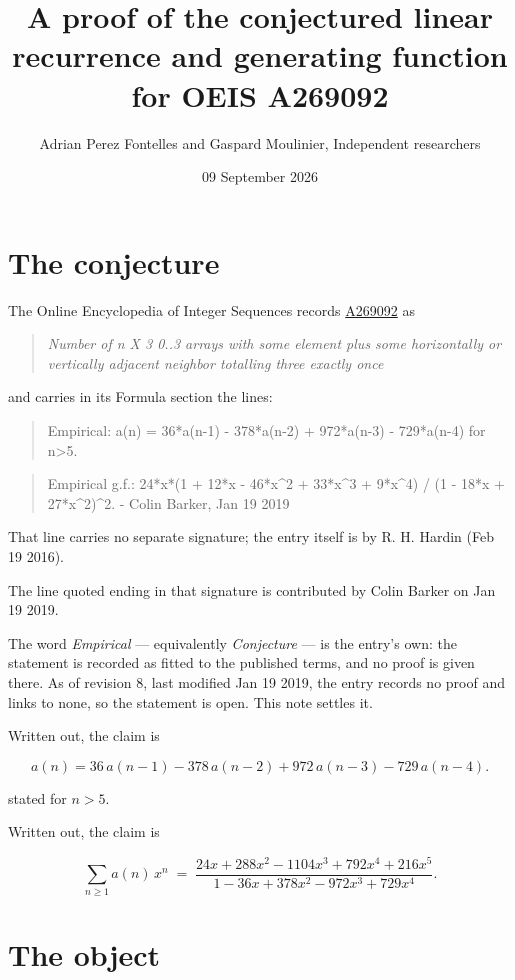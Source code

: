 \documentclass[11pt]{article}
\title{A proof of the conjectured linear recurrence and generating function for OEIS A269092}
\author{Adrian Perez Fontelles and Gaspard Moulinier, Independent researchers}
\date{09 September 2026}
\theoremstyle{definition}
\begin{document}
\maketitle
\section{The conjecture}

The Online Encyclopedia of Integer Sequences records \href{https://oeis.org/A269092}{A269092} as

\begin{quote}\itshape Number of n X 3 0..3 arrays with some element plus some horizontally or vertically adjacent neighbor totalling three exactly once\end{quote}

and carries in its Formula section the lines:

\begin{quote}\ttfamily Empirical: a(n) = 36*a(n-1) - 378*a(n-2) + 972*a(n-3) - 729*a(n-4) for n>5.\end{quote}

\begin{quote}\ttfamily Empirical g.f.: 24*x*(1 + 12*x - 46*x\textasciicircum{}2 + 33*x\textasciicircum{}3 + 9*x\textasciicircum{}4) / (1 - 18*x + 27*x\textasciicircum{}2)\textasciicircum{}2. - Colin Barker, Jan 19 2019\end{quote}

That line carries no separate signature; the entry itself is by R. H. Hardin (Feb 19 2016).

The line quoted ending in that signature is contributed by Colin Barker on Jan 19 2019.

The word {\itshape Empirical} --- equivalently {\itshape Conjecture} --- is the entry's own: the statement is recorded as fitted to the published terms, and no proof is given there. As of revision 8, last modified Jan 19 2019, the entry records no proof and links to none, so the statement is open. This note settles it.

Written out, the claim is

\[a(n) = 36\,a(n-1) - 378\,a(n-2) + 972\,a(n-3) - 729\,a(n-4).\]

stated for $n > 5$.

Written out, the claim is

\[\sum_{n \ge 1} a(n)\,x^n \;=\; \frac{24x + 288x^{2} - 1104x^{3} + 792x^{4} + 216x^{5}}{1 - 36x + 378x^{2} - 972x^{3} + 729x^{4}}.\]

\section{The object}
\end{document}
